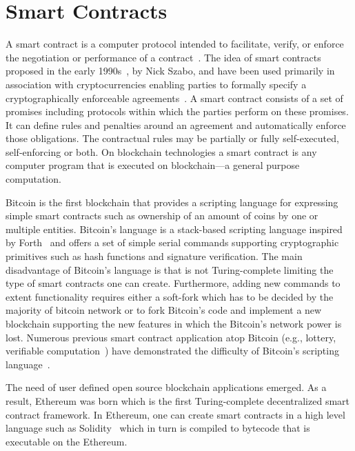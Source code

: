 \section{Smart Contracts}
\label{smart_contracts}

A smart contract is a computer protocol intended to facilitate, verify, or enforce the negotiation or performance of a contract~\cite{FM548,szabo1996smart}.
The idea of smart contracts proposed in the early 1990s~\cite{FM548}, by Nick Szabo, and have been used primarily in association with cryptocurrencies enabling
parties to formally specify a cryptographically enforceable agreements~\cite{7163021}. A smart contract consists of a set of promises including protocols within which the parties perform on these promises. It can define rules and penalties around an agreement and automatically enforce those obligations. The contractual rules may be partially or fully self-executed, self-enforcing or both. On blockchain technologies a smart contract is any computer program that is executed on blockchain---a general purpose computation.

Bitcoin is the first blockchain that provides a scripting language for expressing simple smart contracts such as ownership of an amount of coins by one or multiple entities. Bitcoin's language is a stack-based scripting language inspired by Forth~\cite{forth_lang} and offers a set of simple serial commands supporting cryptographic primitives such as hash functions and signature verification. The main disadvantage of Bitcoin's language is that is not Turing-complete limiting the type of smart contracts one can create. Furthermore, adding new commands to extent functionality requires either a soft-fork which has to be decided by the majority of bitcoin network or to fork Bitcoin's code and implement a new blockchain supporting the new features in which the Bitcoin's network power is lost. Numerous previous smart contract application atop Bitcoin (e.g., lottery\cite{Andrychowicz:2014:SMC:2650286.2650764,10.1007/978-3-662-44381-1_24},
verifiable computation~\cite{Kumaresan:2014:UBI:2660267.2660380}) have demonstrated the difficulty of Bitcoin's scripting language~\cite{cryptoeprint:2015:675}.

The need of user defined open source blockchain applications emerged. As a result, Ethereum was born which is the first Turing-complete decentralized smart contract framework. In Ethereum, one can create smart contracts in a high level language such as Solidity~\cite{solidity} which in turn is compiled to bytecode that is executable on the Ethereum.

